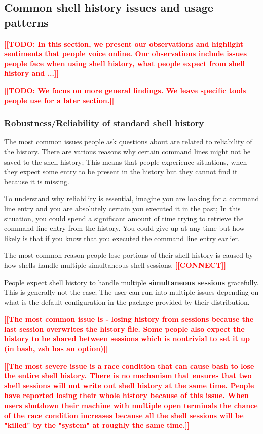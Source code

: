 \documentclass[thesis=M,english]{FITthesis}[2012/10/20]
\newcommand{\todotext}[1]{\textcolor{red}{\textbf{[[#1]]}}}
\begin{document}
\subsection{Common shell history issues and usage patterns}

\todotext{TODO: In this section, we present our observations and highlight sentiments that people voice online. Our observations include issues people face when using shell history, what people expect from shell history and ...}

\todotext{TODO: We focus on more general findings. We leave specific tools people use for a later section.}


\subsubsection*{Robustness/Reliability of standard shell history}

The most common issues people ask questions about are related to reliability of the history.
There are various reasons why certain command lines might not be saved to the shell history; This means that people experience situations, when they expect some entry to be present in the history  but they cannot find it because it is missing.

To understand why reliability is essential, imagine you are looking for a command line entry and you are absolutely certain you executed it in the past; In this situation, you could spend a significant amount of time trying to retrieve the command line entry from the history. You could give up at any time but how likely is that if you know that you executed the command line entry earlier.

The most common reason people lose portions of their shell history is caused by how shells handle multiple simultaneous shell sessions.    
\todotext{CONNECT}

People expect shell history to handle multiple \textbf{simultaneous sessions} gracefully. This is generally not the case; The user can run into multiple issues depending on what is the default configuration in the package provided by their distribution.

\todotext{The most common issue is - losing history from sessions because the last session overwrites the history file. Some people also expect the history to be shared between sessions which is nontrivial to set it up (in bash, zsh has an option)}


\todotext{The most severe issue is a race condition that can cause bash to lose the entire shell history. There is no mechanism that ensures that two shell sessions will not write out shell history at the same time. People have reported losing their whole history because of this issue. When users shutdown their machine with multiple open terminals the chance of the race condition increases because all the shell sessions will be "killed" by the "system" at roughly the same time.}
\end{document}
